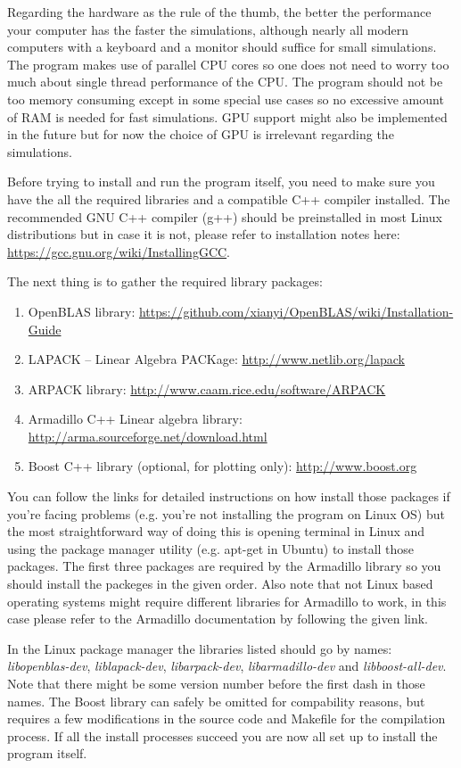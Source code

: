 \documentclass[english,12pt,a4paper,pdftex,sci,utf8]{aaltothesis}
\begin{document}
Regarding the hardware as the rule of the thumb, the better the performance your computer has the faster the simulations, although nearly all modern computers with a keyboard and a monitor should suffice for small simulations. The program makes use of parallel CPU cores so one does not need to worry too much about single thread performance of the CPU. The program should not be too memory consuming except in some special use cases so no excessive amount of RAM is needed for fast simulations. GPU support might also be implemented in the future but for now the choice of GPU is irrelevant regarding the simulations.
\par Before trying to install and run the program itself, you need to make sure you have the all the required libraries and a compatible C++ compiler installed. The recommended GNU C++ compiler (g++) should be preinstalled in most Linux distributions but in case it is not, please refer to installation notes here: \url{https://gcc.gnu.org/wiki/InstallingGCC}. 
\par The next thing is to gather the required library packages:
\begin{enumerate}
\item OpenBLAS library: \url{https://github.com/xianyi/OpenBLAS/wiki/Installation-Guide}
\item LAPACK -- Linear Algebra PACKage: \url{http://www.netlib.org/lapack}
\item ARPACK library: \url{http://www.caam.rice.edu/software/ARPACK}
\item Armadillo C++ Linear algebra library: \url{http://arma.sourceforge.net/download.html} 
\item Boost C++ library (optional, for plotting only): \url{http://www.boost.org}
\end{enumerate}
You can follow the links for detailed instructions on how install those packages if you're facing problems (e.g. you're not installing the program on Linux OS) but the most straightforward way of doing this is opening terminal in Linux and using the package manager utility (e.g. apt-get in Ubuntu) to install those packages. The first three packages are required by the Armadillo library so you should install the packeges in the given order. Also note that not Linux based operating systems might require different libraries for Armadillo to work, in this case please refer to the Armadillo documentation by following the given link. 
\par In the Linux package manager the libraries listed should go by names: \textit{libopenblas-dev}, \textit{liblapack-dev}, \textit{libarpack-dev}, \textit{libarmadillo-dev} and \textit{libboost-all-dev}. Note that there might be some version number before the first dash in those names. The Boost library can safely be omitted for compability reasons, but requires a few modifications in the source code and Makefile for the compilation process. If all the install processes succeed you are now all set up to install the program itself.
\end{document}
